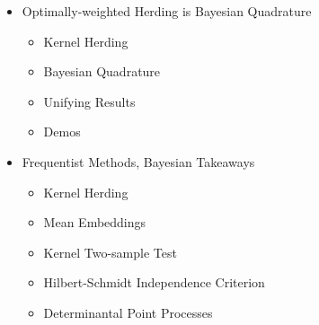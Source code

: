 \documentclass[usenames,dvipsnames]{beamer}
\begin{document}
\begin{frame}[plain, t]
	\bodyheaderskip
	\slidebody
	{
			\begin{itemize}
			\item Optimally-weighted Herding is Bayesian Quadrature
			\begin{itemize}
				\item Kernel Herding
				\item Bayesian Quadrature			
				\item Unifying Results
				\item Demos
			\end{itemize}			
			\item Frequentist Methods, Bayesian Takeaways
			\begin{itemize}
				\item Kernel Herding
				\item Mean Embeddings				
				\item Kernel Two-sample Test
				\item Hilbert-Schmidt Independence Criterion
				\item Determinantal Point Processes
			\end{itemize}
		\end{itemize}
		
	}
\end{frame}



\end{document}
